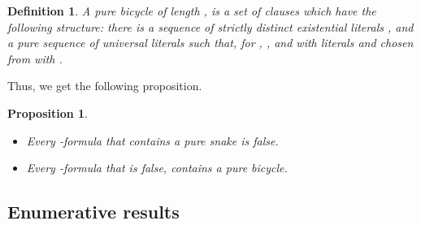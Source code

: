\documentclass[aop,noinfoline]{imsart}
\newtheorem{proposition}[theorem]{Proposition}
\newtheorem{definition}[theorem]{Definition}
\begin{document}
\begin{definition}
  A \emph{ pure bicycle} of length , is a set of   clauses  which have the following structure:
there is a sequence of  
strictly distinct existential literals , and a pure sequence of  universal literals   such
that, for  , ,  and   with literals  and  chosen from  with . 
\end{definition}

Thus, we get the following proposition.
\begin{proposition}\label{prop:certificates}\ 

 \begin{itemize}
 \item Every -formula that contains a pure snake is false.
\item Every   -formula that is false, contains a pure bicycle.
\end{itemize}
\end{proposition}

\subsection{Enumerative results}\label{subsec:enum}
\end{document}

